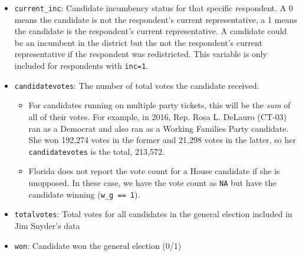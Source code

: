 \documentclass[12pt]{article}
\begin{document}
\begin{itemize}[leftmargin=*]
\item \texttt{current\_inc}: Candidate incumbency status for that specific respondent. A 0 means the candidate is not the respondent's current representative, a 1 means the candidate is the respondent's current representative. A candidate could be an incumbent in the district but the not the respondent's current representative if the respondent was redistricted. This variable is only included for respondents with \texttt{inc=1}.

			
			
\item \texttt{candidatevotes}: The number of total votes the candidate received. 
\begin{itemize}
\item For candidates running on multiple party tickets, this will be the \emph{sum} of all of their votes.  For example, in 2016, Rep. Rosa L. DeLauro (CT-03) ran as a Democrat and also ran as a Working Families Party candidate. She won 192,274 votes in the former and 21,298 votes in the latter, so her \texttt{candidatevotes} is the total, 213,572.
\item  Florida does not report the vote count for a House candidate if she is unopposed. In these case, we have the vote count as \texttt{NA} but have the candidate winning (\texttt{w\_g == 1}).
\end{itemize}
				

\item \texttt{totalvotes}: Total votes for all candidates in the general election included in Jim Snyder's data

\item \texttt{won}: Candidate won the general election (0/1)



\end{itemize}
\end{document}
